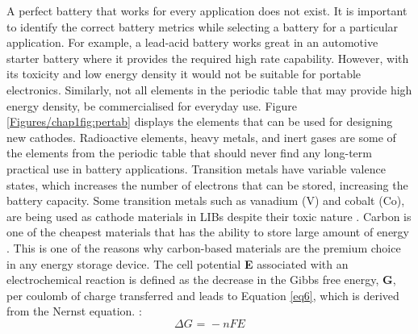 A perfect battery that works for every application does not exist. It is important to identify the correct battery metrics while selecting a battery for a particular application. For example, a lead-acid battery works great in an automotive starter battery where it provides the required high rate capability. However, with its toxicity and low energy density it would not be suitable for portable electronics. Similarly, not all elements in the periodic table that may provide high energy density, be commercialised for everyday use. Figure \ref{Figures/chap1fig:pertab} displays the elements that can be used for designing new cathodes. Radioactive elements, heavy metals, and inert gases are some of the elements from the periodic table that should never find any long-term practical use in battery applications. Transition metals have variable valence states, which increases the number of electrons that can be stored, increasing the battery capacity. Some transition metals such as vanadium (V) and cobalt (Co), are being used as cathode materials in LIBs despite their toxic nature \cite{cui_carbon/titanium_2010,qu_vanadium_2019,salunkhe_direct_2014,spreafico_pvdf_2014}. Carbon is one of the cheapest materials that has the ability to store large amount of energy \cite{candelaria_nanostructured_2012}. This is one of the reasons why carbon-based materials are the premium choice in any energy storage device.
The cell potential \textbf{E} associated with an electrochemical reaction is defined as the decrease in the Gibbs free energy, \textbf{G}, per coulomb of charge transferred and leads to Equation \ref{eq6}, which is derived from the Nernst equation.  :
\begin{equation} \label{eq6}
    \Delta G \text{ = } -nFE
\end{equation}\\
